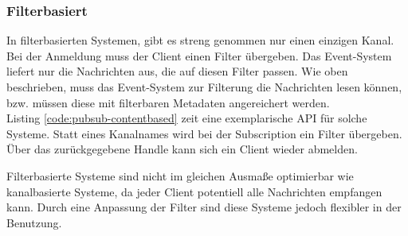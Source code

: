 \subsubsection{Filterbasiert}
\label{chap:grundlagen:pubsub:filterbased}
In filterbasierten Systemen, gibt es streng genommen nur einen einzigen Kanal. Bei der Anmeldung muss der Client einen Filter übergeben. Das Event-System liefert nur die Nachrichten aus, die auf diesen Filter passen. Wie oben beschrieben, muss das Event-System zur Filterung die Nachrichten lesen können, bzw. müssen diese mit filterbaren Metadaten angereichert werden.\\
Listing \ref{code:pubsub-contentbased} zeit eine exemplarische API für solche Systeme. Statt eines Kanalnames wird bei der Subscription ein Filter übergeben. Über das zurückgegebene Handle kann sich ein Client wieder abmelden.

Filterbasierte Systeme sind nicht im gleichen Ausmaße optimierbar wie kanalbasierte Systeme, da jeder Client potentiell alle Nachrichten empfangen kann. Durch eine Anpassung der Filter sind diese Systeme jedoch flexibler in der Benutzung.



